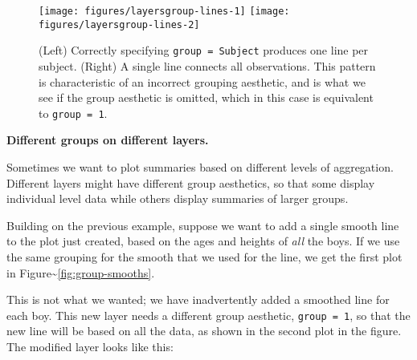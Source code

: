 \begin{figure}
\texttt{[image: figures/layersgroup-lines-1]} \texttt{[image: figures/layersgroup-lines-2]} \caption{(Left) Correctly specifying {\tt group = Subject} produces one line per subject.  (Right) A single line connects all observations. This pattern is characteristic of an incorrect grouping aesthetic, and is what we see if the group aesthetic is omitted, which in this case is equivalent to {\tt group = 1}.\label{fig:group-lines}}
\end{figure}

\textbf{Different groups on different layers.}

Sometimes we want to plot summaries based on different levels of
aggregation. Different layers might have different group aesthetics, so
that some display individual level data while others display summaries
of larger groups.

Building on the previous example, suppose we want to add a single smooth
line to the plot just created, based on the ages and heights of
\emph{all} the boys. If we use the same grouping for the smooth that we
used for the line, we get the first plot in
Figure\textasciitilde{}\ref{fig:group-smooths}. 

\begin{Shaded}
\begin{Highlighting}[]
\StringTok{ }\NormalTok{(}\NormalTok{(} \NormalTok{, } 
\end{Highlighting}
\end{Shaded}

This is not what we wanted; we have inadvertently added a smoothed line
for each boy. This new layer needs a different group aesthetic,
\texttt{group = 1}, so that the new line will be based on all the data,
as shown in the second plot in the figure. The modified layer looks like
this:

\begin{Shaded}
\begin{Highlighting}[]
\StringTok{ }\NormalTok{(}\NormalTok{(} \NormalTok{), }\NormalTok{, } \NormalTok{, } 
\end{Highlighting}
\end{Shaded}

